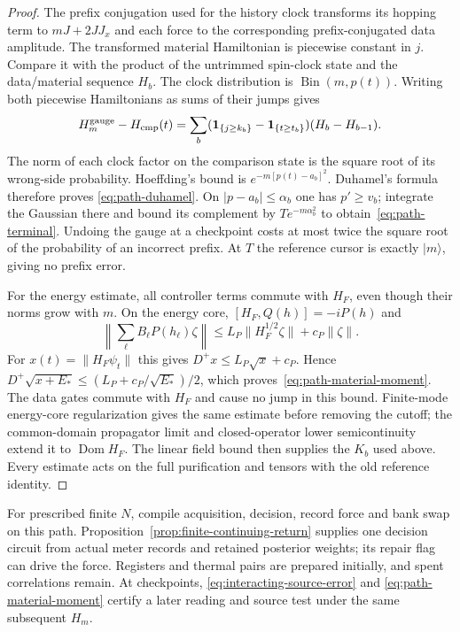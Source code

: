 \begin{proof}
The prefix conjugation used for the history clock transforms its
hopping term to $mJ+2JJ_x$ and each force to the corresponding
prefix-conjugated data amplitude. The transformed material Hamiltonian
is piecewise constant in $j$. Compare it with the product of the
untrimmed spin-clock state and the data/material sequence $H_b$.
The clock distribution is $\operatorname{Bin}(m,p(t))$.
Writing both piecewise Hamiltonians as sums of their jumps gives
\[
 H_m^{\rm gauge}-H_{\rm cmp}(t)
 =\sum_b(\mathbf1_{\{j\ge k_b\}}-
             \mathbf1_{\{t\ge t_b\}})(H_b-H_{b-1}).
\]
The norm of each clock factor on the comparison state is the square
root of its wrong-side probability. Hoeffding's bound is
$e^{-m[p(t)-a_b]^2}$. Duhamel's formula therefore proves
\eqref{eq:path-duhamel}. On $|p-a_b|\le\alpha_b$ one has
$p'\ge v_b$; integrate the Gaussian there and bound its complement
by $T e^{-m\alpha_b^2}$ to obtain~\eqref{eq:path-terminal}.
Undoing the gauge at a checkpoint costs at most twice the square
root of the probability of an incorrect prefix. At $T$ the reference
cursor is exactly $|m\rangle$, giving no prefix error.

For the energy estimate, all controller terms commute with $H_F$,
even though their norms grow with $m$. On the energy core,
$[H_F,Q(h)]=-iP(h)$ and
\[
 \left\|\sum_\ell B_\ell P(h_\ell)\zeta\right\|
 \le L_P\|H_F^{1/2}\zeta\|+c_P\|\zeta\|.
\]
For $x(t)=\|H_F\psi_t\|$ this gives
$D^+x\le L_P\sqrt{x}+c_P$. Hence
$D^+\sqrt{x+E_*}\le(L_P+c_P/\sqrt{E_*})/2$,
which proves~\eqref{eq:path-material-moment}. The data gates commute
with $H_F$ and cause no jump in this bound. Finite-mode energy-core
regularization gives the same estimate before removing the cutoff;
the common-domain propagator limit and closed-operator lower
semicontinuity extend it to $\operatorname{Dom}H_F$. The linear field
bound then supplies the $K_b$ used above. Every estimate acts on the
full purification and tensors with the old reference identity.
\end{proof}

For prescribed finite $N$, compile acquisition, decision, record force
and bank swap on this path. Proposition~\ref{prop:finite-continuing-return}
supplies one decision circuit from actual meter records and retained
posterior weights; its repair flag can drive the force. Registers and
thermal pairs are prepared initially, and spent correlations remain.
At checkpoints, \eqref{eq:interacting-source-error} and
\eqref{eq:path-material-moment} certify a later reading and source
test under the same subsequent $H_m$.

